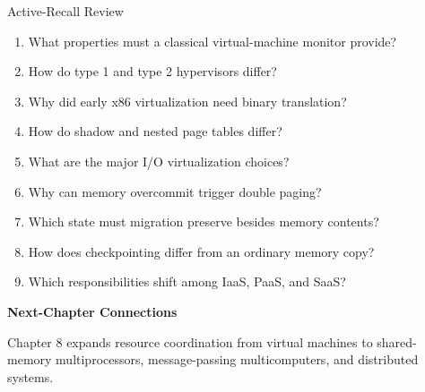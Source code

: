 \documentclass[10pt,letterpaper]{article}
\begin{document}
\enlargethispage{2\baselineskip}
\begin{studybox}{Active-Recall Review}
\small
\begin{enumerate}
  \item What properties must a classical virtual-machine monitor provide?
  \item How do type 1 and type 2 hypervisors differ?
  \item Why did early x86 virtualization need binary translation?
  \item How do shadow and nested page tables differ?
  \item What are the major I/O virtualization choices?
  \item Why can memory overcommit trigger double paging?
  \item Which state must migration preserve besides memory contents?
  \item How does checkpointing differ from an ordinary memory copy?
  \item Which responsibilities shift among IaaS, PaaS, and SaaS?
\end{enumerate}
\end{studybox}

\par\medskip
{\color{navy}\bfseries Next-Chapter Connections}\par\smallskip
Chapter 8 expands resource coordination from virtual machines to shared-memory multiprocessors, message-passing multicomputers, and distributed systems.
\normalsize
\end{document}
